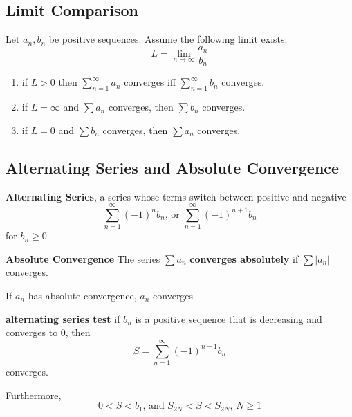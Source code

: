 \subsection{Limit Comparison}

Let $a_{n},b_{n}$ be positive sequences. Assume the following limit exists:
\begin{equation}
	\label{}
	L= \lim_{n\to\infty} \frac{a_{n}}{b_{n}}
\end{equation}


\begin{enumerate}
	\item if $L>0$ then $\sum_{n=1}^{\infty} a_{n}$ converges iff $\sum_{n=1}^{\infty}b_{n}$ converges.	

	\item if $L=\infty$ and $\sum a_{n}$ converges, then $\sum b_{n}$ converges.
	

	\item if $L=0$ and $\sum b_{n}$ converges, then $\sum a_{n}$ converges.

\end{enumerate}


\subsection{Alternating Series and Absolute Convergence}

\textbf{Alternating Series}, a series whose terms switch between positive and negative
\begin{equation}
	\label{}
	\sum_{n=1}^{\infty}(-1)^{n}b_{n} \mbox{, or } \sum_{n=1}^{\infty}(-1)^{n+1}b_{n}	
\end{equation}
for $b_{n}\geq 0$

\textbf{Absolute Convergence} The series $\sum a_{n}$ \textbf{converges absolutely} if $\sum |a_{n}|$ converges.

If $a_{n}$ has absolute convergence, $a_{n}$ converges

\hfill
\hfill

\textbf{alternating series test}
if $b_{n}$ is a positive sequence that is decreasing and converges to 0, then
\begin{equation}
	\label{}
S=\sum_{n=1}^{\infty}(-1)^{n-1}b_{n}
\end{equation}
converges.

\hfill


Furthermore,
\begin{equation}
	\label{}
	0<S<b_{1} \mbox{, and } S_{2N}<S<S_{2N}\mbox{, } N\geq 1	
\end{equation}


